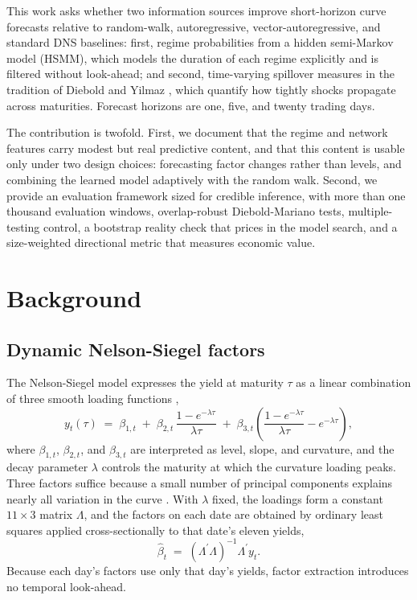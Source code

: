 \documentclass[10pt]{article}
\begin{document}
This work asks whether two information sources improve short-horizon curve forecasts relative to random-walk, autoregressive, vector-autoregressive, and standard DNS baselines: first, regime probabilities from a hidden semi-Markov model (HSMM), which models the duration of each regime explicitly and is filtered without look-ahead; and second, time-varying spillover measures in the tradition of Diebold and Yilmaz \cite{dieboldyilmaz2012}, which quantify how tightly shocks propagate across maturities. Forecast horizons are one, five, and twenty trading days.

The contribution is twofold. First, we document that the regime and network features carry modest but real predictive content, and that this content is usable only under two design choices: forecasting factor changes rather than levels, and combining the learned model adaptively with the random walk. Second, we provide an evaluation framework sized for credible inference, with more than one thousand evaluation windows, overlap-robust Diebold-Mariano tests, multiple-testing control, a bootstrap reality check that prices in the model search, and a size-weighted directional metric that measures economic value.

\section{Background}

\subsection{Dynamic Nelson-Siegel factors}

The Nelson-Siegel model expresses the yield at maturity $\tau$ as a linear combination of three smooth loading functions \cite{nelsonsiegel1987, diebold2006},
\begin{equation}
y_t(\tau) \;=\; \beta_{1,t} \;+\; \beta_{2,t}\,\frac{1-e^{-\lambda \tau}}{\lambda \tau} \;+\; \beta_{3,t}\left(\frac{1-e^{-\lambda \tau}}{\lambda \tau} - e^{-\lambda \tau}\right),
\label{eq:ns}
\end{equation}
where $\beta_{1,t}$, $\beta_{2,t}$, and $\beta_{3,t}$ are interpreted as level, slope, and curvature, and the decay parameter $\lambda$ controls the maturity at which the curvature loading peaks. Three factors suffice because a small number of principal components explains nearly all variation in the curve \cite{litterman1991}. With $\lambda$ fixed, the loadings form a constant $11 \times 3$ matrix $\Lambda$, and the factors on each date are obtained by ordinary least squares applied cross-sectionally to that date's eleven yields,
\begin{equation}
\hat{\beta}_t \;=\; (\Lambda^{\prime}\Lambda)^{-1}\Lambda^{\prime} y_t .
\label{eq:ols}
\end{equation}
Because each day's factors use only that day's yields, factor extraction introduces no temporal look-ahead.
\end{document}
